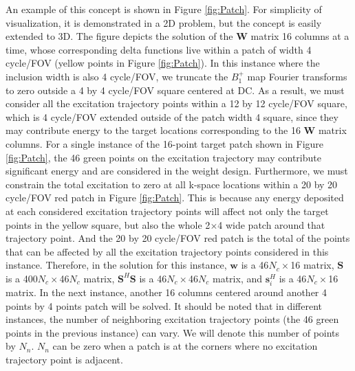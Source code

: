 An example of this concept is shown in Figure \ref{fig:Patch}. For simplicity of visualization, it is demonstrated in a 2D problem, but the concept is easily extended to 3D. The figure depicts the solution of the $\mathbf{W}$ matrix 16 columns at a time, whose corresponding delta functions live within a patch of width 4 cycle/FOV (yellow points in Figure \ref{fig:Patch}). In this instance where the inclusion width is also 4 cycle/FOV, we truncate the $B_1^+$ map Fourier transforms to zero outside a 4 by 4 cycle/FOV square centered at DC. As a result, we must consider all the excitation trajectory points within a 12 by 12 cycle/FOV square, which is 4 cycle/FOV extended outside of the patch width 4 square, since they may contribute energy to the target locations corresponding to the 16 $\mathbf{W}$ matrix columns. For a single instance of the 16-point target patch shown in Figure \ref{fig:Patch}, the 46 green points on the excitation trajectory may contribute significant energy and are considered in the weight design. Furthermore, we must constrain the total excitation to zero at all k-space locations within a 20 by 20 cycle/FOV red patch in Figure \ref{fig:Patch}. This is because any energy deposited at each considered excitation trajectory points will affect not only the target points in the yellow square, but also the whole 2$\times$4 wide patch around that trajectory point. And the 20 by 20 cycle/FOV red patch is the total of the points that can be affected by all the excitation trajectory points considered in this instance. Therefore, in the solution for this instance, $\mathbf{w}$ is a 46$N_c\times$16 matrix, $\mathbf{S}$ is a 400$N_c\times$46$N_c$ matrix, $\mathbf{S}^{H}\mathbf{S}$ is a 46$N_c\times$46$N_c$ matrix, and $\mathbf{s}_i^{H}$ is a 46$N_c\times$16 matrix. 
In the next instance, another 16 columns centered around another 4 points by 4 points patch will be solved. It should be noted that in different instances, the number of neighboring excitation trajectory points (the 46 green points in the previous instance) can vary. We will denote this number of points by $N_n$. $N_n$ can be zero when a patch is at the corners where no excitation trajectory point is adjacent. 

